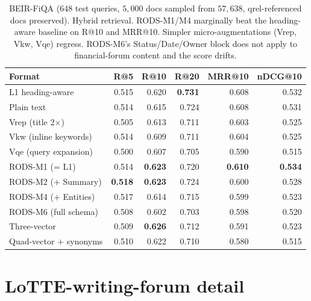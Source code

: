 \documentclass[11pt]{article}
\begin{document}
\begin{table}[H]
\centering
\caption{BEIR-FiQA ($648$ test queries, $5{,}000$ docs sampled from
  $57{,}638$, qrel-referenced docs preserved). Hybrid retrieval.
  RODS-M1/M4 marginally beat the heading-aware baseline on R@10 and
  MRR@10. Simpler micro-augmentations (Vrep, Vkw, Vqe) regress.
  RODS-M6's Status/Date/Owner block does not apply to financial-forum
  content and the score drifts.}
\label{tab:fiqa}
\begin{tabular}{lrrrrr}
\toprule
\textbf{Format} & \textbf{R@5} & \textbf{R@10} & \textbf{R@20} & \textbf{MRR@10} & \textbf{nDCG@10} \\
\midrule
L1 heading-aware             & 0.515 & 0.620 & \textbf{0.731} & 0.608 & 0.532 \\
Plain text                       & 0.514 & 0.615 & 0.724 & 0.608 & 0.531 \\
\midrule
Vrep (title 2$\times$)       & 0.505 & 0.613 & 0.711 & 0.603 & 0.525 \\
Vkw (inline keywords)        & 0.514 & 0.609 & 0.711 & 0.604 & 0.525 \\
Vqe (query expansion)        & 0.500 & 0.607 & 0.705 & 0.590 & 0.515 \\
\midrule
RODS-M1 (= L1)               & 0.514 & \textbf{0.623} & 0.720 & \textbf{0.610} & \textbf{0.534} \\
RODS-M2 ($+$ Summary)        & \textbf{0.518} & \textbf{0.623} & 0.724 & 0.600 & 0.528 \\
RODS-M4 ($+$ Entities)       & 0.517 & 0.614 & 0.715 & 0.599 & 0.523 \\
RODS-M6 (full schema)        & 0.508 & 0.602 & 0.703 & 0.598 & 0.520 \\
\midrule
Three-vector                 & 0.509 & \textbf{0.626} & 0.712 & 0.591 & 0.523 \\
Quad-vector $+$ synonyms     & 0.510 & 0.622 & 0.710 & 0.580 & 0.515 \\
\bottomrule
\end{tabular}
\end{table}

\section{LoTTE-writing-forum detail}
\label{app:lotte}
\end{document}
